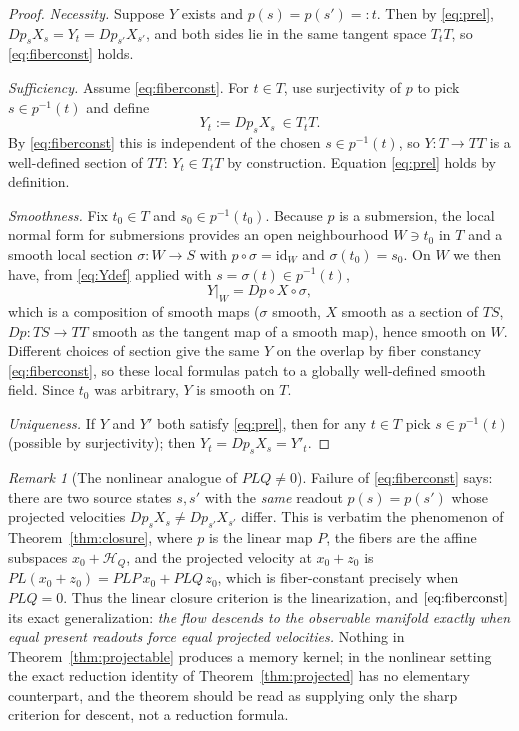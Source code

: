 \documentclass[11pt,reqno]{amsart}
\numberwithin{equation}{section}
\theoremstyle{plain}
\theoremstyle{definition}
\theoremstyle{remark}
\newtheorem{remark}[theorem]{Remark}
\newcommand{\HQ}{\mathcal{H}_{Q}}
\begin{document}
\begin{proof}
\emph{Necessity.} Suppose $Y$ exists and $p(s)=p(s')=:t$. Then by \eqref{eq:prel},
$Dp_{s}X_{s}=Y_{t}=Dp_{s'}X_{s'}$, and both sides lie in the same tangent space $T_{t}T$, so
\eqref{eq:fiberconst} holds.

\emph{Sufficiency.} Assume \eqref{eq:fiberconst}. For $t\in T$, use surjectivity of $p$ to
pick $s\in p^{-1}(t)$ and define
\begin{equation}
\label{eq:Ydef}
Y_{t}:=Dp_{s}X_{s}\ \in T_{t}T .
\end{equation}
By \eqref{eq:fiberconst} this is independent of the chosen $s\in p^{-1}(t)$, so
$Y:T\to TT$ is a well-defined section of $TT$: $Y_{t}\in T_{t}T$ by construction. Equation
\eqref{eq:prel} holds by definition.

\emph{Smoothness.} Fix $t_{0}\in T$ and $s_{0}\in p^{-1}(t_{0})$. Because $p$ is a
submersion, the local normal form for submersions \cite[Thm.~4.12]{Lee} provides an open
neighbourhood $W\ni t_{0}$ in $T$ and a smooth local section
$\sigma:W\to S$ with $p\circ\sigma=\mathrm{id}_{W}$ and $\sigma(t_{0})=s_{0}$. On $W$ we then
have, from \eqref{eq:Ydef} applied with $s=\sigma(t)\in p^{-1}(t)$,
\begin{equation}
\label{eq:Ylocal}
Y|_{W}=Dp\circ X\circ\sigma ,
\end{equation}
which is a composition of smooth maps ($\sigma$ smooth, $X$ smooth as a section of $TS$,
$Dp:TS\to TT$ smooth as the tangent map of a smooth map), hence smooth on $W$. Different
choices of section give the same $Y$ on the overlap by fiber constancy \eqref{eq:fiberconst},
so these local formulas patch to a globally well-defined smooth field. Since $t_{0}$ was
arbitrary, $Y$ is smooth on $T$.

\emph{Uniqueness.} If $Y$ and $Y'$ both satisfy \eqref{eq:prel}, then for any $t\in T$ pick
$s\in p^{-1}(t)$ (possible by surjectivity); then $Y_{t}=Dp_{s}X_{s}=Y'_{t}$.
\end{proof}

\begin{remark}[The nonlinear analogue of $PLQ\neq0$]
\label{rem:nonlinear}
Failure of \eqref{eq:fiberconst} says: there are two source states $s,s'$ with the \emph{same}
readout $p(s)=p(s')$ whose projected velocities $Dp_{s}X_{s}\neq Dp_{s'}X_{s'}$ differ. This
is verbatim the phenomenon of Theorem~\ref{thm:closure}, where $p$ is the linear map $P$, the
fibers are the affine subspaces $x_{0}+\HQ$, and the projected velocity at $x_{0}+z_{0}$ is
$PL(x_{0}+z_{0})=PLP\,x_{0}+PLQ\,z_{0}$, which is fiber-constant precisely when $PLQ=0$. Thus
the linear closure criterion is the linearization, and $\eqref{eq:fiberconst}$ its exact
generalization: \emph{the flow descends to the observable manifold exactly when equal present
readouts force equal projected velocities.} Nothing in Theorem~\ref{thm:projectable} produces
a memory kernel; in the nonlinear setting the exact reduction identity of
Theorem~\ref{thm:projected} has no elementary counterpart, and the theorem should be read as
supplying only the sharp criterion for descent, not a reduction formula.
\end{remark}
\end{document}
